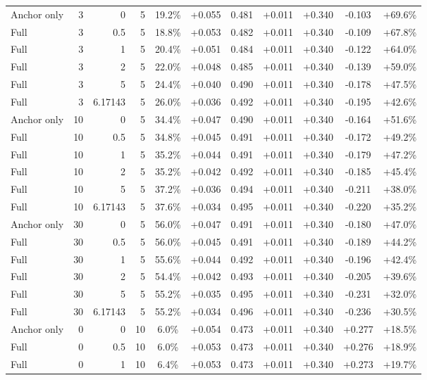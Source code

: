 \begin{table}[htbp]
\begin{tabular}{lrrrccccccc}
Anchor only & 3 & 0 & 5 & 19.2\% & +0.055 & 0.481 & +0.011 & +0.340 & -0.103 & +69.6\% \\
Full & 3 & 0.5 & 5 & 18.8\% & +0.053 & 0.482 & +0.011 & +0.340 & -0.109 & +67.8\% \\
Full & 3 & 1 & 5 & 20.4\% & +0.051 & 0.484 & +0.011 & +0.340 & -0.122 & +64.0\% \\
Full & 3 & 2 & 5 & 22.0\% & +0.048 & 0.485 & +0.011 & +0.340 & -0.139 & +59.0\% \\
Full & 3 & 5 & 5 & 24.4\% & +0.040 & 0.490 & +0.011 & +0.340 & -0.178 & +47.5\% \\
Full & 3 & 6.17143 & 5 & 26.0\% & +0.036 & 0.492 & +0.011 & +0.340 & -0.195 & +42.6\% \\
Anchor only & 10 & 0 & 5 & 34.4\% & +0.047 & 0.490 & +0.011 & +0.340 & -0.164 & +51.6\% \\
Full & 10 & 0.5 & 5 & 34.8\% & +0.045 & 0.491 & +0.011 & +0.340 & -0.172 & +49.2\% \\
Full & 10 & 1 & 5 & 35.2\% & +0.044 & 0.491 & +0.011 & +0.340 & -0.179 & +47.2\% \\
Full & 10 & 2 & 5 & 35.2\% & +0.042 & 0.492 & +0.011 & +0.340 & -0.185 & +45.4\% \\
Full & 10 & 5 & 5 & 37.2\% & +0.036 & 0.494 & +0.011 & +0.340 & -0.211 & +38.0\% \\
Full & 10 & 6.17143 & 5 & 37.6\% & +0.034 & 0.495 & +0.011 & +0.340 & -0.220 & +35.2\% \\
Anchor only & 30 & 0 & 5 & 56.0\% & +0.047 & 0.491 & +0.011 & +0.340 & -0.180 & +47.0\% \\
Full & 30 & 0.5 & 5 & 56.0\% & +0.045 & 0.491 & +0.011 & +0.340 & -0.189 & +44.2\% \\
Full & 30 & 1 & 5 & 55.6\% & +0.044 & 0.492 & +0.011 & +0.340 & -0.196 & +42.4\% \\
Full & 30 & 2 & 5 & 54.4\% & +0.042 & 0.493 & +0.011 & +0.340 & -0.205 & +39.6\% \\
Full & 30 & 5 & 5 & 55.2\% & +0.035 & 0.495 & +0.011 & +0.340 & -0.231 & +32.0\% \\
Full & 30 & 6.17143 & 5 & 55.2\% & +0.034 & 0.496 & +0.011 & +0.340 & -0.236 & +30.5\% \\
Anchor only & 0 & 0 & 10 & 6.0\% & +0.054 & 0.473 & +0.011 & +0.340 & +0.277 & +18.5\% \\
Full & 0 & 0.5 & 10 & 6.0\% & +0.053 & 0.473 & +0.011 & +0.340 & +0.276 & +18.9\% \\
Full & 0 & 1 & 10 & 6.4\% & +0.053 & 0.473 & +0.011 & +0.340 & +0.273 & +19.7\% \\

\end{tabular}
\end{table}
